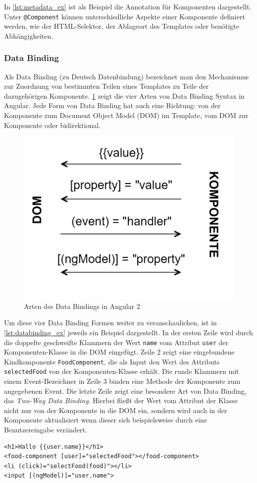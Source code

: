 In \cref{lst:metadata_ex} ist als Beispiel die Annotation für Komponenten dargestellt. Unter \texttt{@Component} können unterschiedliche Aspekte einer Komponente definiert werden, wie der \acs{HTML}-Selektor, der Ablageort des Templates oder benötigte Abhängigkeiten.

\subsubsection{Data Binding}
Als Data Binding (zu Deutsch Datenbindung) bezeichnet man den Mechanismus zur Zuordnung von bestimmten Teilen eines Templates zu Teile der dazugehörigen Komponente. \cref{fig:databinding} zeigt die vier Arten von Data Binding Syntax in Angular. Jede Form von Data Binding hat auch eine Richtung: von der Komponente zum Document Object Model (\acs{DOM}) im Template, vom \acs{DOM} zur Komponente oder bidirektional.

\begin{figure}[ht!]
	\centering
	\includegraphics[width=0.5\linewidth]{bilder/kap5/databinding}
	\caption[Arten des Data Bindings in Angular 2]{Arten des Data Bindings in Angular 2}
	\label{fig:databinding}
\end{figure}

Um diese vier Data Binding Formen weiter zu veranschaulichen, ist in \cref{lst:databinding_ex} jeweils ein Beispiel dargestellt. In der ersten Zeile wird durch die doppelte geschweifte Klammern der Wert \texttt{name} vom Attribut \texttt{user} der Komponenten-Klasse in die \acs{DOM} eingefügt. Zeile 2 zeigt eine eingebundene Kindkomponente \texttt{FoodComponent}, die als Input den Wert des Attributs \texttt{selectedFood} von der Komponenten-Klasse erhält. Die runde Klammern mit einem Event-Bezeichner in Zeile 3 binden eine Methode der Komponente zum angegebenen Event. Die letzte Zeile zeigt eine besondere Art von Data Binding, das \textit{Two-Way Data Binding}. Hierbei fließt der Wert vom Attribut der Klasse nicht nur von der Komponente in die \acs{DOM} ein, sondern wird auch in der Komponente aktualisiert wenn dieser sich beispielsweise durch eine Benutzereingabe verändert.
\\
\begin{lstlisting}[language=HTML5,caption={Beispiele zu den Data Binding Arten},label=lst:databinding_ex]
<h1>Hallo {{user.name}}</h1>
<food-component [user]="selectedFood"></food-component>
<li (click)="selectFood(food)"></li>
<input [(ngModel)]="user.name">
\end{lstlisting}


